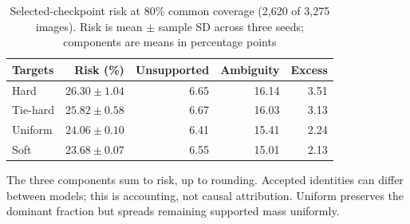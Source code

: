 \begin{table}[t]
\caption{Selected-checkpoint risk at 80\% common coverage (2,620 of 3,275 images). Risk is mean $\pm$ sample SD across three seeds; components are means in percentage points}\label{tab:primary}
\centering\begin{tabular}{lrrrr}\toprule
Targets & Risk (\%) & Unsupported & Ambiguity & Excess\\\midrule
Hard & $26.30 \pm 1.04$ & 6.65 & 16.14 & 3.51\\
Tie-hard & $25.82 \pm 0.58$ & 6.67 & 16.03 & 3.13\\
Uniform & $24.06 \pm 0.10$ & 6.41 & 15.41 & 2.24\\
Soft & $23.68 \pm 0.07$ & 6.55 & 15.01 & 2.13\\
\bottomrule\end{tabular}
\smallskip\par\footnotesize The three components sum to risk, up to rounding. Accepted identities can differ between models; this is accounting, not causal attribution. Uniform preserves the dominant fraction but spreads remaining supported mass uniformly.
\end{table}
